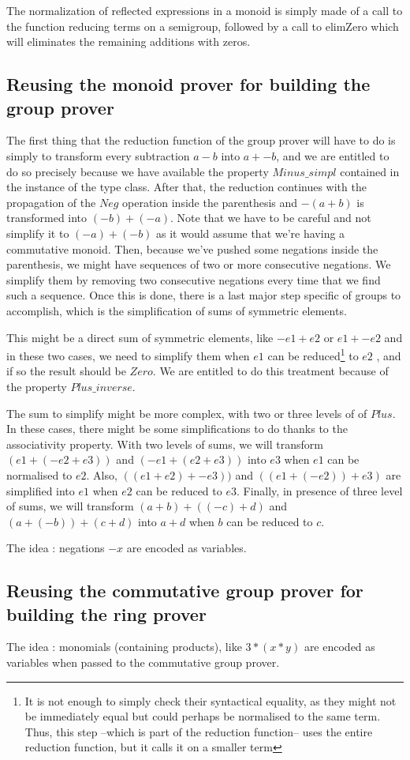 The normalization of reflected expressions in a monoid is simply made of a call to the function reducing terms on a semigroup, followed by a call to elimZero which will eliminates the remaining additions with zeros. 


\subsection {Reusing the monoid prover for building the group prover}

The first thing that the reduction function of the group prover will have to do is simply to transform every subtraction $a-b$ into $a + -b$, and we are entitled to do so precisely because we have available the property $Minus\_simpl$ contained in the instance of the type class.
After that, the reduction continues with the propagation of the $Neg$ operation inside the parenthesis and $-(a+b)$ is transformed into $(-b) + (-a)$. Note that we have to be careful and not simplify it to $(-a) + (-b)$ as it would assume that we're having a commutative monoid.
Then, because we've pushed some negations inside the parenthesis, we might have sequences of two or more consecutive negations. We simplify them by removing two consecutive negations every time that we find such a sequence. Once this is done, there is a last major step specific of groups to accomplish, which is the simplification of sums of symmetric elements. 

This might be a direct sum of symmetric elements, like $-e1 + e2$ or $e1 + -e2$ and in these two cases, we need to simplify them when $e1$ can be reduced\footnote{It is not enough to simply check their syntactical equality, as they might not be immediately equal but could perhaps be normalised to the same term. Thus, this step --which is part of the reduction function-- uses the entire reduction function, but it calls it on a smaller term} to $e2$ , and if so the result should be $Zero$. We are entitled to do this treatment because of the property $Plus\_inverse$.

The sum to simplify might be more complex, with two or three levels of of $Plus$. In these cases, there might be some simplifications to do thanks to the associativity property. With two levels of sums, we will transform $(e1 + (-e2 + e3))$ and $(-e1 + (e2+e3))$ into $e3$ when $e1$ can be normalised to $e2$. Also, $((e1+e2) + -e3))$ and $((e1+(-e2)) + e3)$ are simplified into $e1$ when $e2$ can be reduced to $e3$. Finally, in presence of three level of sums, we will transform $(a+b) + ((-c)+d)$ and $(a+(-b)) + (c+d)$ into $a+d$ when $b$ can be reduced to $c$.


The idea : negations $-x$ are encoded as variables.

\subsection {Reusing the commutative group prover for building the ring prover}

The idea : monomials (containing products), like $3*(x*y)$ are encoded as variables when passed to the commutative group prover. 
